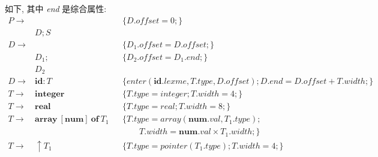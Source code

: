 \documentclass[boxes]{homework}
\begin{document}
\begin{solution}
    如下, 其中 \textit{end} 是综合属性:
    \begin{equation}
        \begin{aligned}
            P \to &                                                    &  & \{D.\mathit{offset} = 0;\}                                                                    \\
                  & D; S                                                                                                                                                  \\
            D \to &                                                    &  & \{D_{1}.\mathit{offset} = D.\mathit{offset};\}                                                \\
                  & D_{1};                                             &  & \{D_{2}.\mathit{offset} = D_{1}.end;\}                                                        \\
                  & D_{2}                                                                                                                                                 \\
            D \to & \mathbf{id}: T                                     &  & \{enter(\mathbf{id}.lexme, T.type, D.\mathit{offset}); D.end = D.\mathit{offset} + T.width;\} \\
            T \to & \mathbf{integer}                                   &  & \{T.type = integer; T.width = 4;\}                                                            \\
            T \to & \mathbf{real}                                      &  & \{T.type = real; T.width = 8;\}                                                               \\
            T \to & \mathbf{array}\ [\mathbf{num}]\ \mathbf{of}\ T_{1} &  & \{T.type = array(\mathbf{num}.val, T_{1}.type);                                               \\
                  &                                                    &  & \qquad T.width = \mathbf{num}.val \times T_{1}.width;\}                                       \\
            T \to & \uparrow T_{1}                                     &  & \{T.type = pointer(T_{1}.type); T.width = 4;\}
        \end{aligned}
    \end{equation}
\end{solution}
\end{document}
